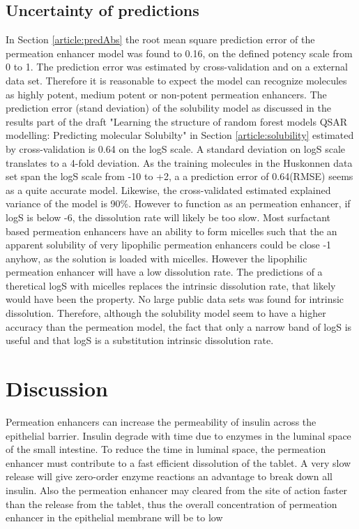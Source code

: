 \subsection{Uncertainty of predictions}
In Section \ref{article:predAbs} the root mean square prediction error of the permeation enhancer model was found to 0.16, on the defined potency scale from 0 to 1. The prediction error was estimated by cross-validation and on a external data set. Therefore it is reasonable to expect the model can recognize molecules as highly potent, medium potent or non-potent permeation enhancers. The prediction error (stand deviation) of the solubility model as discussed in the results part of the draft "Learning the structure of random forest models QSAR modelling: Predicting molecular Solubilty" in Section \ref{article:solubility} estimated by cross-validation is 0.64 on the logS scale. A standard deviation on logS scale translates to a 4-fold deviation. As the training molecules in the Huskonnen data set \cite{palmer2007random} span the logS scale from -10 to +2, a a prediction error of 0.64(RMSE) seems as a quite accurate model. Likewise, the cross-validated estimated explained variance of the model is 90\%. However to function as an permeation enhancer, if logS is below -6, the dissolution rate will likely be too slow. Most surfactant based permeation enhancers have an ability to form micelles such that the an apparent solubility of very lipophilic permeation enhancers could be close -1 anyhow, as the solution is loaded with micelles. However the lipophilic permeation enhancer will have a low dissolution rate. The predictions of a theretical logS with micelles replaces the intrinsic dissolution rate, that likely would have been the property. No large public data sets was found for intrinsic dissolution. Therefore, although the solubility model seem to have a higher accuracy than the permeation model, the fact that only a narrow band of logS is useful and that logS is a substitution intrinsic dissolution rate.


\section{Discussion}

Permeation enhancers can increase the permeability of insulin across the epithelial barrier. Insulin degrade with time due to enzymes in the luminal space of the small intestine. To reduce the time in luminal space, the permeation enhancer must contribute to a fast efficient dissolution of the tablet. A very slow release will give zero-order enzyme reactions an advantage to break down all insulin. Also the permeation enhancer may cleared from the site of action faster than the release from the tablet, thus the overall concentration of permeation enhancer in the epithelial membrane will be to low

